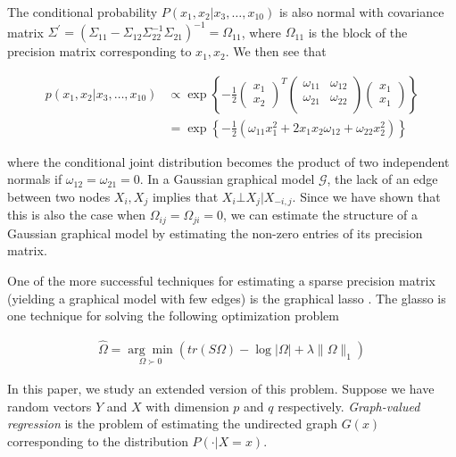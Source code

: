 \documentclass[12pt]{article}
\begin{document}
The conditional probability $P(x_1, x_2 | x_3, \ldots, x_{10})$ is also normal with covariance matrix $\Sigma^\prime = (\Sigma_{11} - \Sigma_{12} \Sigma_{22}^{-1} \Sigma_{21})^{-1} = \Omega_{11}$, where $\Omega_{11}$ is the block of the precision matrix corresponding to $x_1, x_2$. We then see that

\begin{align}
    p(x_1, x_2 | x_3, \ldots, x_{10}) &\propto \exp \left\{
      - \frac{1}{2}
      \begin{pmatrix}
        x_1 \\
        x_2
      \end{pmatrix}^T
      \begin{pmatrix}
        \omega_{11} & \omega_{12} \\
        \omega_{21} & \omega_{22} \\
      \end{pmatrix}
      \begin{pmatrix}
        x_1 \\
        x_1
      \end{pmatrix}
    \right\} \\
    &= \exp \left\{
      - \frac{1}{2}
      \left(
        \omega_{11} x_1^2 + 2 x_1 x_2 \omega_{12} + \omega_{22} x_2^2
      \right)
    \right\}
\end{align}

where the conditional joint distribution becomes the product of two independent normals if $\omega_{12} = \omega_{21} = 0$. In a Gaussian graphical model $\mathcal{G}$, the lack of an edge between two nodes $X_i, X_j$ implies that $X_i \bot X_j | X_{-i,j}$. Since we have shown that this is also the case when $\Omega_{ij} = \Omega_{ji} = 0$, we can estimate the structure of a Gaussian graphical model by estimating the non-zero entries of its precision matrix.

One of the more successful techniques for estimating a sparse precision matrix (yielding a graphical model with few edges) is the graphical lasso \cite{friedman2008}. The glasso is one technique for solving the following optimization problem

\begin{align}
    \hat{\Omega} = \underset{\Omega \succ 0}{\arg\min} \left( tr(S\Omega) - \log |\Omega| + \lambda \|\Omega\|_1 \right)
\end{align}

In this paper, we study an extended version of this problem. Suppose we have random vectors $Y$ and $X$ with dimension $p$ and $q$ respectively. \textit{Graph-valued regression} is the problem of estimating the undirected graph $G(x)$ corresponding to the distribution $P(\cdot|X=x)$.
\end{document}
